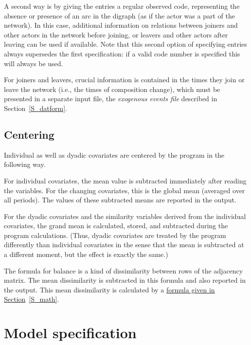 \documentclass[a4paper,fleqn]{article}
\newcommand{\+}{\, + \,}
\begin{document}
{A second way is by giving the entries a regular observed code,
representing the absence or presence of an arc in the digraph (as
if the actor was a part of the network). In this case, additional
information on relations between joiners and other actors in the
network before joining, or leavers and other actors after leaving
can be used if available. Note that this second option of
specifying entries always supersedes the first specification: if a
valid code number is specified this will always be used.

For joiners and leavers, crucial information is contained in the
times they join or leave the network (i.e., the times of
composition change), which must be presented in a separate input
file, the \emph{exogenous events file}
described in Section~\ref{S_datform}.


\subsection{Centering}

Individual as well as dyadic covariates are
\hypertarget{T_S_centering}{centered}
by the program in the following way.

For individual covariates, the mean value is subtracted
immediately after reading the variables. For the changing
covariates, this is the global mean (averaged over all periods).
The values of these subtracted means are reported in the output.

For the dyadic covariates and the similarity variables derived
from the individual covariates, the grand mean is calculated,
stored, and subtracted during the program calculations. (Thus,
dyadic covariates are treated by the program differently than
individual covariates in the sense that the mean is subtracted at
a different moment, but the effect is exactly the same.)

The formula for balance is a kind of dissimilarity between rows of
the adjacency matrix. The mean dissimilarity is subtracted in this
formula and also reported in the output. This mean dissimilarity
is calculated by a
\hyperlink{T_meanbal}{formula given in Section}~\ref{S_math}.


\begin{print}
\newpage
\end{print}
\section{Model specification}
\label{S_modspec}

}
\end{document}
